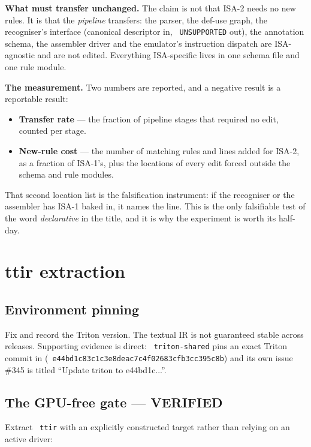 \documentclass[11pt,a4paper]{article}
\newcommand{\code}[1]{\texttt{\small\hyphenchar\font=45 #1}}
\newcommand{\verified}{\textbf{\textcolor{green!45!black}{VERIFIED}}}
\begin{document}
\noindent\textbf{What must transfer unchanged.} The claim is not that ISA-2 needs no new rules. It is that the
\emph{pipeline} transfers: the parser, the def-use graph, the recogniser's interface (canonical descriptor in,
\code{UNSUPPORTED} out), the annotation schema, the assembler driver and the emulator's instruction dispatch
are ISA-agnostic and are not edited. Everything ISA-specific lives in one schema file and one rule module.

\noindent\textbf{The measurement.} Two numbers are reported, and a negative result is a reportable result:

\begin{itemize}[leftmargin=1.3em,itemsep=0.25em]
\item \textbf{Transfer rate} --- the fraction of pipeline stages that required no edit, counted per stage.
\item \textbf{New-rule cost} --- the number of matching rules and lines added for ISA-2, as a fraction of
      ISA-1's, plus the locations of every edit forced outside the schema and rule modules.
\end{itemize}

\noindent That second location list is the falsification instrument: if the recogniser or the assembler has
ISA-1 baked in, it names the line. This is the only falsifiable test of the word \emph{declarative} in the
title, and it is why the experiment is worth its half-day.

\section{ttir extraction}\label{sec:extraction}

\subsection{Environment pinning}

Fix and record the Triton version. The textual IR is not guaranteed stable across releases. Supporting
evidence is direct: \code{triton-shared} pins an exact Triton commit in
 (\code{e44bd1c83c1c3e8deac7c4f02683cfb3cc395c8b}) and its own issue \#345 is titled
``Update triton to e44bd1c...''.

\subsection{The GPU-free gate --- \verified{}}

Extract \code{ttir} with an explicitly constructed target rather than relying on an active driver:
\end{document}

